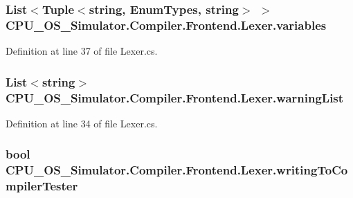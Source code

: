 \subsubsection[{variables}]{\setlength{\rightskip}{0pt plus 5cm}List$<$Tuple$<$string, {\bf Enum\+Types}, string$>$ $>$ C\+P\+U\+\_\+\+O\+S\+\_\+\+Simulator.\+Compiler.\+Frontend.\+Lexer.\+variables\hspace{0.3cm}{\ttfamily [private]}}\label{class_c_p_u___o_s___simulator_1_1_compiler_1_1_frontend_1_1_lexer_af7e42e63231b352e446b5be89623c74a}


Definition at line 37 of file Lexer.\+cs.

\hypertarget{class_c_p_u___o_s___simulator_1_1_compiler_1_1_frontend_1_1_lexer_ac240cede3460c43d89c4387c04f00377}{}
\subsubsection[{warning\+List}]{\setlength{\rightskip}{0pt plus 5cm}List$<$string$>$ C\+P\+U\+\_\+\+O\+S\+\_\+\+Simulator.\+Compiler.\+Frontend.\+Lexer.\+warning\+List\hspace{0.3cm}{\ttfamily [private]}}\label{class_c_p_u___o_s___simulator_1_1_compiler_1_1_frontend_1_1_lexer_ac240cede3460c43d89c4387c04f00377}


Definition at line 34 of file Lexer.\+cs.

\hypertarget{class_c_p_u___o_s___simulator_1_1_compiler_1_1_frontend_1_1_lexer_a8a75fa6d30d6d3b2ab713a729d85b081}{}
\subsubsection[{writing\+To\+Compiler\+Tester}]{\setlength{\rightskip}{0pt plus 5cm}bool C\+P\+U\+\_\+\+O\+S\+\_\+\+Simulator.\+Compiler.\+Frontend.\+Lexer.\+writing\+To\+Compiler\+Tester\hspace{0.3cm}{\ttfamily [private]}}\label{class_c_p_u___o_s___simulator_1_1_compiler_1_1_frontend_1_1_lexer_a8a75fa6d30d6d3b2ab713a729d85b081}


